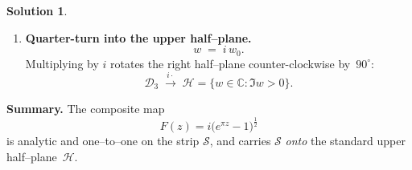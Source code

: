 \documentclass[12pt]{article}
\theoremstyle{definition} %
\newtheorem{solution}{Solution}
\theoremstyle{plain} %
\begin{document}
\begin{solution}
\begin{enumerate}[label=\textbf{Step \arabic*:}, itemsep=1.4ex]
      \item \textbf{Quarter-turn into the upper half–plane.}  
      \[
      w \;=\; i\,w_0.
      \]
      Multiplying by $i$ rotates the right half–plane
      counter-clockwise by~$90^{\circ}$:
      \[
      \mathcal D_3
      \;\xrightarrow{\,i\cdot\,}\;
      \boxed{
         \mathcal H
         = \{w\in\mathbb{C} : \Im w>0\}
       }.
      \]
      
      \end{enumerate}
      
      \medskip
      \textbf{Summary.}  
      The composite map
      \[
      \boxed{\;
         F(z)=i\bigl(e^{\pi z}-1\bigr)^{\tfrac12}
       \;}
      \]
      is analytic and one–to–one on the strip
      $\mathcal S$, and carries $\mathcal S$ \emph{onto} the standard
      upper half–plane~$\mathcal H$.
      \end{solution}
\end{document}
